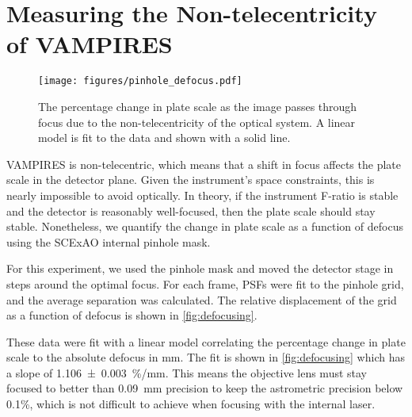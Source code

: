 \section{Measuring the Non-telecentricity of VAMPIRES}\label{sec:telecentricity}

\begin{figure}
    \centering
    \texttt{[image: figures/pinhole\_defocus.pdf]}
    \caption{The percentage change in plate scale as the image passes through focus due to the non-telecentricity of the optical system. A linear model is fit to the data and shown with a solid line.\label{fig:defocusing}}
\end{figure}

VAMPIRES is non-telecentric, which means that a shift in focus affects the plate scale in the detector plane. Given the instrument's space constraints, this is nearly impossible to avoid optically. In theory, if the instrument F-ratio is stable and the detector is reasonably well-focused, then the plate scale should stay stable. Nonetheless, we quantify the change in plate scale as a function of defocus using the SCExAO internal pinhole mask.

For this experiment, we used the pinhole mask and moved the detector stage in steps around the optimal focus. For each frame, PSFs were fit to the pinhole grid, and the average separation was calculated. The relative displacement of the grid as a function of defocus is shown in \autoref{fig:defocusing}.

These data were fit with a linear model correlating the percentage change in plate scale to the absolute defocus in \si{\milli\meter}. The fit is shown in \autoref{fig:defocusing} which has a slope of \SI{1.106(3)}{\%/\milli\meter}. This means the objective lens must stay focused to better than \SI{0.09}{\milli\meter} precision to keep the astrometric precision below 0.1\%, which is not difficult to achieve when focusing with the internal laser.
